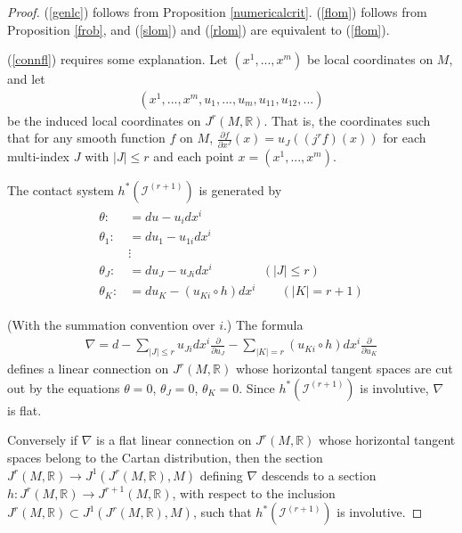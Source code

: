 \documentclass[12pt]{article}
\numberwithin{equation}{section}
\theoremstyle{plain}
\theoremstyle{definition}
\newcommand{\R}{\mathbb{R}}
\newcommand{\ra}{\rightarrow}
\begin{document}
\begin{proof} (\ref{genlc}) follows from Proposition \ref{numericalcrit}. (\ref{flom}) follows from Proposition \ref{frob}, and (\ref{slom}) and (\ref{rlom}) are equivalent to (\ref{flom}).

(\ref{connfl}) requires some explanation. Let $(x^{1},...,x^{m})$ be local coordinates on $M$, and let
\begin{align*}
(x^{1},...,x^{m},u_{1},...,u_{m},u_{11},u_{12},...)
\end{align*}
be the induced local coordinates on $J^{r}(M,\R)$. That is, the coordinates such that for any smooth function $f$ on $M$, $\frac{\partial f}{\partial x^{J}}(x)=u_{J}((j^{r}f)(x))$ for each multi-index $J$ with $|J|\leq r$ and each point $x=(x^{1},...,x^{m})$.

The contact system $h^{*}(\mathcal{I}^{(r+1)})$ is generated by
\begin{align}\label{gcoords}
\begin{split}
\theta:&=du-u_{i}dx^{i} \\
\theta_{1}:&=du_{1}-u_{1i}dx^{i} \\
&\vdots \\
\theta_{J}:&=du_{J}-u_{Ji}dx^{i}\qquad\qquad (|J|\leq r)\\
\theta_{K}:&=du_{K}-(u_{Ki}\circ h)dx^{i}\qquad (|K|=r+1)
\end{split}
\end{align}

(With the summation convention over $i$.) The formula
\begin{align*}
\nabla= d - \sum_{|J|\leq r} u_{Ji}dx^{i}\frac{\partial}{\partial u_{J}} - \sum_{|K|=r} (u_{Ki}\circ h)dx^{i}\frac{\partial}{\partial u_{K}}
\end{align*}
defines a linear connection on $J^{r}(M,\R)$ whose horizontal tangent spaces are cut out by the equations $\theta=0$, $\theta_{J}=0$, $\theta_{K}=0$. Since $h^{*}(\mathcal{I}^{(r+1)})$ is involutive, $\nabla$ is flat.

Conversely if $\nabla$ is a flat linear connection on $J^{r}(M,\R)$ whose horizontal tangent spaces belong to the Cartan distribution, then the section $J^{r}(M,\R)\ra J^{1}(J^{r}(M,\R),M)$ defining $\nabla$ descends to a section $h:J^{r}(M,\R)\ra J^{r+1}(M,\R)$, with respect to the inclusion $J^{r}(M,\R)\subset J^{1}(J^{r}(M,\R),M)$, such that $h^{*}(\mathcal{I}^{(r+1)})$ is involutive.
\end{proof}
\end{document}
